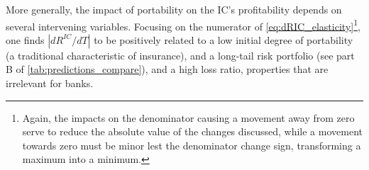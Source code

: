More generally, the impact of portability on the IC's profitability depends on several intervening variables. Focusing on the numerator of \autoref{eq:dRIC_elasticity}\footnote{Again, the impacts on the denominator causing a movement away from zero serve to reduce the absolute value of the changes discussed, while a movement towards zero must be minor lest the denominator change sign, transforming a maximum into a minimum.}, one finds $|dR^{IC}/dT|$ to be positively related to a low initial degree of portability (a traditional characteristic of insurance), and a long-tail risk portfolio (see part B of \autoref{tab:predictions_compare}), and a high loss ratio, properties that are irrelevant for banks.
